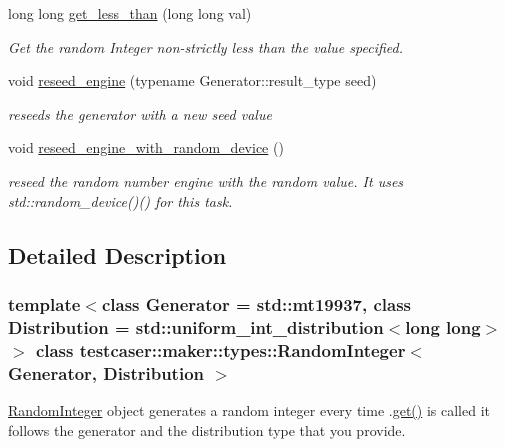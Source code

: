\begin{DoxyCompactItemize}
long long \hyperlink{classtestcaser_1_1maker_1_1types_1_1RandomInteger_afe7ef6baf52d095f5b17ad4f8d9e5f1a}{get\+\_\+less\+\_\+than} (long long val)
\begin{DoxyCompactList}\small\item\em Get the random Integer non-\/strictly less than the value specified. \end{DoxyCompactList}\item 
void \hyperlink{classtestcaser_1_1maker_1_1types_1_1RandomInteger_a86d3dace9ceb412e5337da90818da7b6}{reseed\+\_\+engine} (typename Generator\+::result\+\_\+type seed)
\begin{DoxyCompactList}\small\item\em reseeds the generator with a new seed value \end{DoxyCompactList}\item 
\mbox{\label{classtestcaser_1_1maker_1_1types_1_1RandomInteger_acf2d349fda6b89bad9f0de71947a637e}} 
void \hyperlink{classtestcaser_1_1maker_1_1types_1_1RandomInteger_acf2d349fda6b89bad9f0de71947a637e}{reseed\+\_\+engine\+\_\+with\+\_\+random\+\_\+device} ()
\begin{DoxyCompactList}\small\item\em reseed the random number engine with the random value. It uses std\+::random\+\_\+device()() for this task. \end{DoxyCompactList}\end{DoxyCompactItemize}


\subsection{Detailed Description}
\subsubsection*{template$<$class Generator = std\+::mt19937, class Distribution = std\+::uniform\+\_\+int\+\_\+distribution$<$long long$>$$>$\newline
class testcaser\+::maker\+::types\+::\+Random\+Integer$<$ Generator, Distribution $>$}

\hyperlink{classtestcaser_1_1maker_1_1types_1_1RandomInteger}{Random\+Integer} object generates a random integer every time .\hyperlink{classtestcaser_1_1maker_1_1types_1_1RandomInteger_a3b7754ca1c579f58b959ca6adb483a51}{get()} is called it follows the generator and the distribution type that you provide. 


